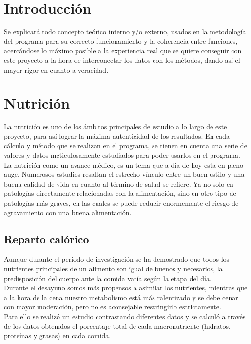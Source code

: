 
\section{Introducción}
Se explicará todo concepto teórico interno y/o externo, usados en la metodología del programa para su correcto funcionamiento y la coherencia entre funciones, acercándose lo máximo posible a la experiencia real que se quiere conseguir con este proyecto a la hora de interconectar los datos con los métodos, dando así el mayor rigor en cuanto a veracidad.
\section{Nutrición}
La nutrición es uno de los ámbitos principales de estudio a lo largo de este proyecto, para así lograr la máxima autenticidad de los resultados. En cada cálculo y método que se realizan en el programa, se tienen en cuenta una serie de valores y datos meticulosamente estudiados para poder usarlos en el programa.\\

La nutrición como un avance médico, es un tema que a día de hoy esta en pleno auge. Numerosos estudios resaltan el estrecho vínculo entre un buen estilo y una buena calidad de vida en cuanto al término de salud se refiere. Ya no solo en patologías directamente relacionadas con la alimentación, sino en otro tipo de patologías más graves, en las cuales se puede reducir enormemente el riesgo de agravamiento con una buena alimentación.\cite{prevCancer}
\subsection{Reparto calórico}

Aunque durante el periodo de investigación se ha demostrado que todos los nutrientes principales de un alimento son igual de buenos y necesarios, la predisposición del cuerpo ante la comida varía según la etapa del día. \\

Durante el desayuno somos más propensos a asimilar los nutrientes, mientras que a la hora de la cena nuestro metabolismo está más ralentizado y se debe cenar con mayor moderación, pero no es aconsejable restringirlo estrictamente.\\

Para ello se realizó un estudio contrastando diferentes datos y se calculó a través de los datos obtenidos el porcentaje total de cada macronutriente (hidratos, proteínas y grasas) en cada comida.
